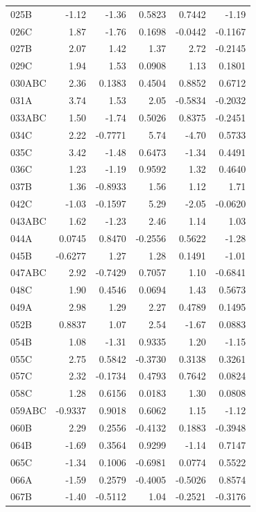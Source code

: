 \begin{longtable}{lrrrrr}
  025B & -1.12 & -1.36 & 0.5823 & 0.7442 & -1.19 \\
  026C & 1.87 & -1.76 & 0.1698 & -0.0442 & -0.1167 \\
  027B & 2.07 & 1.42 & 1.37 & 2.72 & -0.2145 \\
  029C & 1.94 & 1.53 & 0.0908 & 1.13 & 0.1801 \\
  030ABC & 2.36 & 0.1383 & 0.4504 & 0.8852 & 0.6712 \\
  031A & 3.74 & 1.53 & 2.05 & -0.5834 & -0.2032 \\
  033ABC & 1.50 & -1.74 & 0.5026 & 0.8375 & -0.2451 \\
  034C & 2.22 & -0.7771 & 5.74 & -4.70 & 0.5733 \\
  035C & 3.42 & -1.48 & 0.6473 & -1.34 & 0.4491 \\
  036C & 1.23 & -1.19 & 0.9592 & 1.32 & 0.4640 \\
  037B & 1.36 & -0.8933 & 1.56 & 1.12 & 1.71 \\
  042C & -1.03 & -0.1597 & 5.29 & -2.05 & -0.0620 \\
  043ABC & 1.62 & -1.23 & 2.46 & 1.14 & 1.03 \\
  044A & 0.0745 & 0.8470 & -0.2556 & 0.5622 & -1.28 \\
  045B & -0.6277 & 1.27 & 1.28 & 0.1491 & -1.01 \\
  047ABC & 2.92 & -0.7429 & 0.7057 & 1.10 & -0.6841 \\
  048C & 1.90 & 0.4546 & 0.0694 & 1.43 & 0.5673 \\
  049A & 2.98 & 1.29 & 2.27 & 0.4789 & 0.1495 \\
  052B & 0.8837 & 1.07 & 2.54 & -1.67 & 0.0883 \\
  054B & 1.08 & -1.31 & 0.9335 & 1.20 & -1.15 \\
  055C & 2.75 & 0.5842 & -0.3730 & 0.3138 & 0.3261 \\
  057C & 2.32 & -0.1734 & 0.4793 & 0.7642 & 0.0824 \\
  058C & 1.28 & 0.6156 & 0.0183 & 1.30 & 0.0808 \\
  059ABC & -0.9337 & 0.9018 & 0.6062 & 1.15 & -1.12 \\
  060B & 2.29 & 0.2556 & -0.4132 & 0.1883 & -0.3948 \\
  064B & -1.69 & 0.3564 & 0.9299 & -1.14 & 0.7147 \\
  065C & -1.34 & 0.1006 & -0.6981 & 0.0774 & 0.5522 \\
  066A & -1.59 & 0.2579 & -0.4005 & -0.5026 & 0.8574 \\
  067B & -1.40 & -0.5112 & 1.04 & -0.2521 & -0.3176 \\

\end{longtable}
